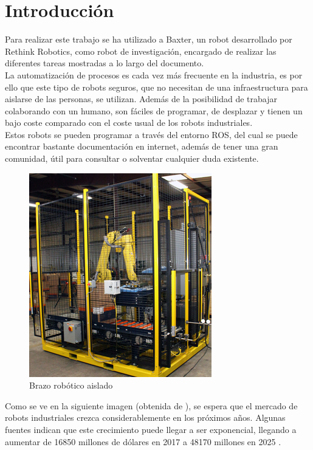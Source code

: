 \section{Introducción}
\label{intro}
\noindent Para realizar este trabajo se ha utilizado a Baxter, un robot desarrollado por Rethink Robotics, como robot de investigación, encargado de realizar las diferentes tareas mostradas a lo largo del documento. \\

\noindent La automatización de procesos es cada vez más frecuente en la industria, es por ello que este tipo de robots seguros, que no necesitan de una infraestructura para aislarse de las personas, se utilizan. Además de la posibilidad de trabajar colaborando con un humano, son fáciles de programar, de desplazar y tienen un bajo coste comparado con el coste usual de los robots industriales.\\
Estos robots se pueden programar a través del entorno ROS, del cual se puede encontrar bastante documentación en internet, además de tener una gran comunidad, útil para consultar o solventar cualquier duda existente. \\

\begin{figure}[H]
	\centering %
	\includegraphics[scale=0.6]{imagenes/cage.png}
	\caption{Brazo robótico aislado}
\end{figure}

\noindent Como se ve en la siguiente imagen (obtenida de \cite{robgraph}), se espera que el mercado de robots industriales crezca considerablemente en los próximos años. Algunas fuentes indican que este crecimiento puede llegar a ser exponencial, llegando a aumentar de 16850 millones de dólares en 2017 a 48170 millones en 2025 \cite{robmark}. \\

